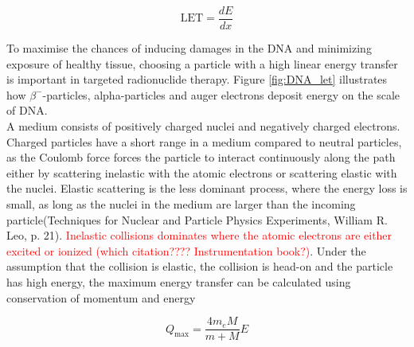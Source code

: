 \documentclass[a4paper,11pt,twoside]{book}
\begin{document}
\begin{equation}
    \text{LET}=\frac{dE}{dx}
\end{equation}

To maximise the chances of inducing damages in the DNA and minimizing exposure of healthy tissue, choosing a particle with a high linear energy transfer is important in targeted radionuclide therapy. Figure \ref{fig:DNA_let} illustrates how $\beta^-$-particles, alpha-particles and auger electrons deposit energy on the scale of DNA. \\

\noindent A medium consists of positively charged nuclei and negatively charged electrons. Charged particles have a short range in a medium compared to neutral particles, as the Coulomb force forces the particle to interact continuously along the path either by scattering inelastic with the atomic electrons or scattering elastic with the nuclei. Elastic scattering is the less dominant process, where the energy loss is small, as long as the nuclei in the medium are larger than the incoming particle(Techniques for Nuclear and Particle Physics Experiments, William R. Leo, p.  21). \textcolor{red}{Inelastic collisions dominates where the atomic electrons are either excited or ionized (which citation???? Instrumentation book?)}. Under the assumption that the collision is elastic, the collision is head-on and the particle has high energy, the maximum energy transfer can be calculated using conservation of momentum and energy

\begin{equation}
    Q_\text{max}=\frac{4m_eM}{m+M}E
\end{equation}
\end{document}
